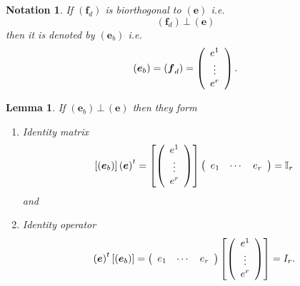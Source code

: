 \documentclass[aps,preprint]{revtex4}%
\newtheorem{lemma}[theorem]{Lemma}
\newtheorem{notation}[theorem]{Notation}
\begin{document}
\begin{notation}
If $\left(  \boldsymbol{f}_{d}\right)  $ is biorthogonal to $\left(
\boldsymbol{e}\right)  $ i.e.
\begin{equation}
\left(  \boldsymbol{f}_{d}\right)  \,\bot\,\left(  \boldsymbol{e}\right)
\end{equation}
\emph{then it is denoted by} $\left(  \boldsymbol{e}_{b}\right)  $ i.e.
\begin{equation}
\left(  \boldsymbol{e}_{b}\right)  =\left(  \boldsymbol{f}_{d}\right)
=\left(
\begin{array}
[c]{c}%
e^{1}\\
\vdots\\
e^{r}%
\end{array}
\right)  .
\end{equation}

\end{notation}

\begin{lemma}
If $\left(  \boldsymbol{e}_{b}\right)  \,\bot\,\left(  \boldsymbol{e}\right)
$ then they form

\begin{enumerate}
\item Identity matrix%
\begin{equation}
\left[  \left(  \boldsymbol{e}_{b}\right)  \right]  \left(  \boldsymbol{e}%
\right)  ^{t}=\left[  \left(
\begin{array}
[c]{c}%
e^{1}\\
\vdots\\
e^{r}%
\end{array}
\right)  \right]  \left(
\begin{array}
[c]{ccc}%
e_{1} & \cdots & e_{r}%
\end{array}
\right)  =\mathbb{I}_{r}%
\end{equation}
and

\item Identity operator
\begin{equation}
\left(  \boldsymbol{e}\right)  ^{t}\left[  \left(  \boldsymbol{e}_{b}\right)
\right]  =\left(
\begin{array}
[c]{ccc}%
e_{1} & \cdots & e_{r}%
\end{array}
\right)  \left[  \left(
\begin{array}
[c]{c}%
e^{1}\\
\vdots\\
e^{r}%
\end{array}
\right)  \right]  =I_{r}.
\end{equation}

\end{enumerate}
\end{lemma}
\end{document}
